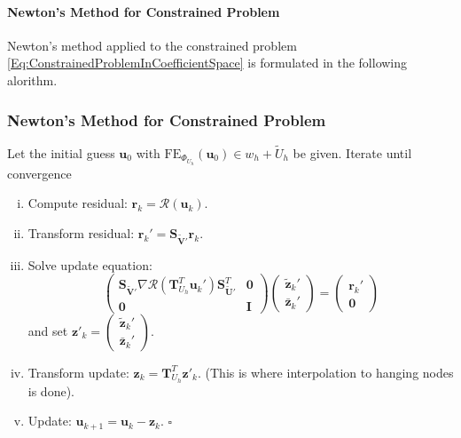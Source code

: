 \paragraph{Newton's Method for Constrained Problem}

Newton's method applied to the constrained
problem \eqref{Eq:ConstrainedProblemInCoefficientSpace} is formulated
in the following alorithm.

\begin{frame}
\frametitle<presentation>{Newton's Method for Constrained Problem}
\begin{Alg}\label{algo:ConstrainedNewton}
Let the initial guess $\mathbf{u}_{0}$ with
$\text{FE}_{\Phi_{U_h}}(\mathbf{u}_{0}) \in w_h + \tilde{U}_h$ be given. 
Iterate until convergence
\begin{enumerate}[i)]
\item Compute residual:
  $\mathbf{r}_k=\mathcal{R}\left(\mathbf{u}_{k}\right)$.
\item Transform residual: $\mathbf{r}_k' = \mathbf{S}_{\tilde{\mathbf{V}}'}
  \mathbf{r}_k$.
\item Solve update equation:
\begin{equation*}
\left(\begin{array}{cc}
\mathbf{S}_{\tilde{\mathbf{V}}'} \nabla
\mathcal{R}\left(\mathbf{T}^T_{U_h}\mathbf{u}_{k}'\right)
\mathbf{S}^T_{\tilde{\mathbf{U}}'} & \mathbf{0}\\
\mathbf{0} & \mathbf{I}
\end{array}\right) 
\left(\begin{array}{c}
\tilde{\mathbf{z}}_{k}'\\
\bar{\mathbf{z}}_{k}'
\end{array}\right) =
\left(\begin{array}{c}
\mathbf{r}_k'\\
\mathbf{0}
\end{array}\right) 
\end{equation*}
and set $\mathbf{z}'_{k} = \left(\begin{smallmatrix}
\tilde{\mathbf{z}}_{k}'\\ \bar{\mathbf{z}}_{k}'
\end{smallmatrix}\right)$.
\item Transform update: $\mathbf{z}_{k} =
  \mathbf{T}^T_{U_h}\mathbf{z}'_k$. (This is where interpolation to
  hanging nodes is done).
\item Update: $\mathbf{u}_{k+1} = \mathbf{u}_k
- \mathbf{z}_k$. \hfill$\square$
\end{enumerate}
\end{Alg}
\end{frame}


